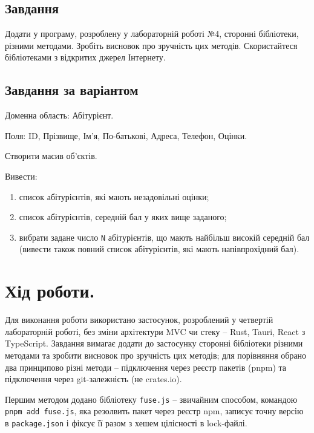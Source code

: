 \documentclass[14pt, a4paper]{extreport}
\begin{document}
	\subsection*{Завдання}
	
	Додати у програму, розроблену у лабораторній роботі №4, сторонні бібліотеки, різними методами. Зробіть висновок про зручність цих методів. Скористайтеся бібліотеками з відкритих джерел Інтернету.
	
	\subsection*{Завдання за варіантом}
	
	Доменна область: Абітурієнт. 
	
	Поля:  ID, Прізвище, Ім'я, По-батькові, Адреса, Телефон, Оцінки. 
	
	Створити масив об'єктів. 
	
	Вивести:
	
	\begin{enumerate}[label=\alph*.]
		\item список абітурієнтів, які мають незадовільні оцінки;
		
		\item список абітурієнтів, середній бал у яких вище заданого;
		
		\item вибрати задане число \texttt{N} абітурієнтів, що мають найбільш високій середній бал (вивести також повний список абітурієнтів, які мають напівпрохідний бал).
	\end{enumerate}
	
	\section*{Хід роботи.}

	Для виконання роботи використано застосунок, розроблений у четвертій лабораторній роботі, без зміни архітектури MVC чи стеку -- Rust, Tauri, React з TypeScript. Завдання вимагає додати до застосунку сторонні бібліотеки різними методами та зробити висновок про зручність цих методів; для порівняння обрано два принципово різні методи -- підключення через реєстр пакетів (pnpm) та підключення через git-залежність (не crates.io).
	
	Першим методом додано бібліотеку \texttt{fuse.js} -- звичайним способом, командою \texttt{pnpm add fuse.js}, яка резолвить пакет через реєстр npm, записує точну версію в \texttt{package.json} і фіксує її разом з хешем цілісності в lock-файлі.
	
\end{document}
